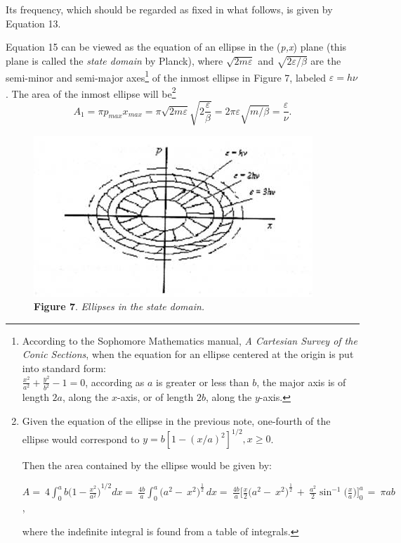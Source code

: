 Its frequency, which should be regarded as fixed in what follows, is
given by Equation 13.

Equation 15 can be viewed as the equation of an ellipse in the
(\emph{p,x}) plane (this plane is called the \emph{state domain} by
Planck), where $\sqrt{2m\varepsilon}$ and $\sqrt{2\varepsilon/\beta}$ are the semi-minor and
semi-major axes\footnote{According to the Sophomore Mathematics manual,
  \emph{A Cartesian Survey of the Conic Sections}, when the equation for
  an ellipse centered at the origin is put into standard form:\\
  \(\frac{x^{2}}{a^{2}} + \frac{y^{2}}{b^{2}} - 1 = 0\), according as
  $a$ is greater or less than $b$, the major axis is of
  length $2a$, along the $x$-axis, or of length $2b$,
  along the $y$-axis.} of the inmost ellipse in Figure 7, labeled
  $\varepsilon = h\nu$. The area of the inmost ellipse will be\footnote{Given
  the equation of the ellipse in the previous note, one-fourth of the
  ellipse would correspond to $y = b[1 - (x/a)^2]^{1/2}, x \geq 0$.

  Then the area contained by the ellipse would be given by:

  \({A = \ 4\int_{0}^{a}{b(1 - \frac{x^{2}}{a^{2}}})}^{1/2}dx = \ \frac{4b}{a}\int_{0}^{a}{({a^{2} - \ x^{2})}^{\frac{1}{2}\ }}dx = \ \frac{4b}{a}\lbrack\frac{x}{2}({a^{2} - \ x^{2})}^{\frac{1}{2}\ } + \ \frac{a^{2}}{2}\sin^{- 1}({\frac{x}{a})}\rbrack_{0\ }^{a} = \ \pi ab\),

  where the indefinite integral is found from a table of integrals.}
%
\begin{equation}
A_1 = \pi p_{max}x_{max} = \pi\sqrt{2m\varepsilon}\sqrt{2\frac{\varepsilon}{\beta}} = 2\pi\varepsilon\sqrt{m/\beta} = \frac{\varepsilon}{\nu}. %
\end{equation}
%
\begin{figure}[h]
  \begin{center}
  \includegraphics[width=4.13542in,height=2.38542in]{images/05_planck/image050.jpg}
  \caption*{\textbf{Figure 7}. \emph{Ellipses in the state domain.}}
  \end{center}
\end{figure}
